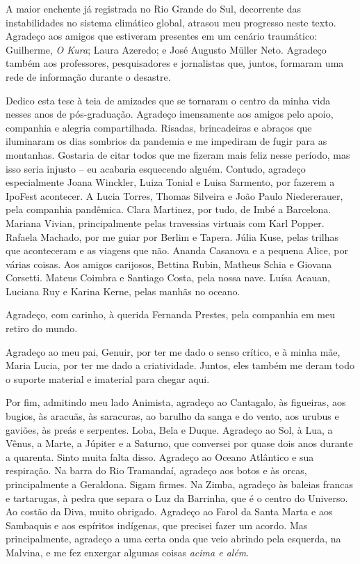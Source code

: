\documentclass[./main.tex]{subfiles}
\begin{document}
\par A maior enchente já registrada no Rio Grande do Sul, decorrente das instabilidades no sistema climático global, atrasou meu progresso neste texto. Agradeço aos amigos que estiveram presentes em um cenário traumático: Guilherme, \textit{O Kura}; Laura Azeredo; e José Augusto Müller Neto. Agradeço também aos professores, pesquisadores e jornalistas que, juntos, formaram uma rede de informação durante o desastre.

\par Dedico esta tese à teia de amizades que se tornaram o centro da minha vida nesses anos de pós-graduação. Agradeço imensamente aos amigos pelo apoio, companhia e alegria compartilhada. Risadas, brincadeiras e abraços que iluminaram os dias sombrios da pandemia e me impediram de fugir para as montanhas. Gostaria de citar todos que me fizeram mais feliz nesse período, mas isso seria injusto -- eu acabaria esquecendo alguém. Contudo, agradeço especialmente Joana Winckler, Luiza Tonial e Luisa Sarmento, por fazerem a IpoFest acontecer. A Lucia Torres, Thomas Silveira e João Paulo Niedererauer, pela companhia pandêmica. Clara Martinez, por tudo, de Imbé a Barcelona. Mariana Vivian, principalmente pelas travessias virtuais com Karl Popper. Rafaela Machado, por me guiar por Berlim e Tapera. Júlia Kuse, pelas trilhas que aconteceram e as viagens que não. Ananda Casanova e a pequena Alice, por várias coisas. Aos amigos carijosos, Bettina Rubin, Matheus Schia e Giovana Corsetti. Mateus Coimbra e Santiago Costa, pela nossa nave. Luísa Acauan, Luciana Ruy e Karina Kerne, pelas manhãs no oceano.

\par Agradeço, com carinho, à querida Fernanda Prestes, pela companhia em meu retiro do mundo.

\par Agradeço ao meu pai, Genuir, por ter me dado o senso crítico, e à minha mãe, Maria Lucia, por ter me dado a criatividade. Juntos, eles também me deram todo o suporte material e imaterial para chegar aqui.

\par Por fim, admitindo meu lado Animista, agradeço ao Cantagalo, às figueiras, aos bugios, às aracuãs, às saracuras, ao barulho da sanga e do vento, aos urubus e gaviões, às preás e serpentes. Loba, Bela e Duque. Agradeço ao Sol, à Lua, a Vênus, a Marte, a Júpiter e a Saturno, que conversei por quase dois anos durante a quarenta. Sinto muita falta disso. Agradeço ao Oceano Atlântico e sua respiração. Na barra do Rio Tramandaí, agradeço aos botos e às orcas, principalmente a Geraldona. Sigam firmes. Na Zimba, agradeço às baleias francas e tartarugas, à pedra que separa o Luz da Barrinha, que é o centro do Universo. Ao costão da Diva, muito obrigado. Agradeço ao Farol da Santa Marta e aos Sambaquis e aos espíritos indígenas, que precisei fazer um acordo. Mas principalmente, agradeço a uma certa onda que veio abrindo pela esquerda, na Malvina, e me fez enxergar algumas coisas \textit{acima e além}. 

\clearpage
\end{document}
